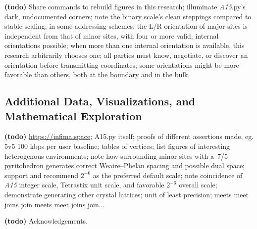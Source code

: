 \documentclass[10pt]{article}
\def\AAAB{\textit{A15}}
\def\TS{Tetrastix} \def\TSP{Tetrastix~Prism} \def\TTSp{The~Tetrastix~prism} \def\tTSp{the~Tetrastix~prism}
\def\WP{Weaire--Phelan} \def\WPH{Weaire--Phelan~Honeycomb} \def\TWPh{The~Weaire--Phelan~honeycomb}
\begin{document}
\textbf{(todo)} Share commands to rebuild figures in this research; illuminate \AAAB.py's dark, undocumented corners; note the
binary scale's clean steppings compared to stable scaling; in some addressing schemes, the L/R orientation of major sites is
independent from that of minor sites, with four or more valid, internal orientations possible; when more than one internal
orientation is available, this research arbitrarily chooses one; all parties must know, negotiate, or discover an orientation
before transmitting coordinates; some orientations might be more favorable than others, both at the boundary and in the bulk.

\subsection{ Additional Data, Visualizations, and Mathematical Exploration
}\label{additional-data-visualizations-and-mathematical-exploration}

\textbf{(todo)} \url{https://infima.space}; A15.py itself; proofs of different assertions made, eg. 5v5 100 kbps per user
baseline; tables of vertices; list figures of interesting heterogenous environments; note how surrounding minor sites with a~7/5
pyritohedron generates correct \WP{} spacing and possible dual space; support and recommend $2^{-6}$ as the preferred default
scale; note coincidence of \AAAB{} integer scale, \TS{} unit scale, and favorable $2^{-6}$ overall scale; demonstrate generating
other crystal lattices; unit of least precision; meets meet joins join meets meet joins join...


\begin{acknowledgements}

  \textbf{(todo)} Acknowledgements.

\end{acknowledgements}


\nocite{*}  
\end{document}
